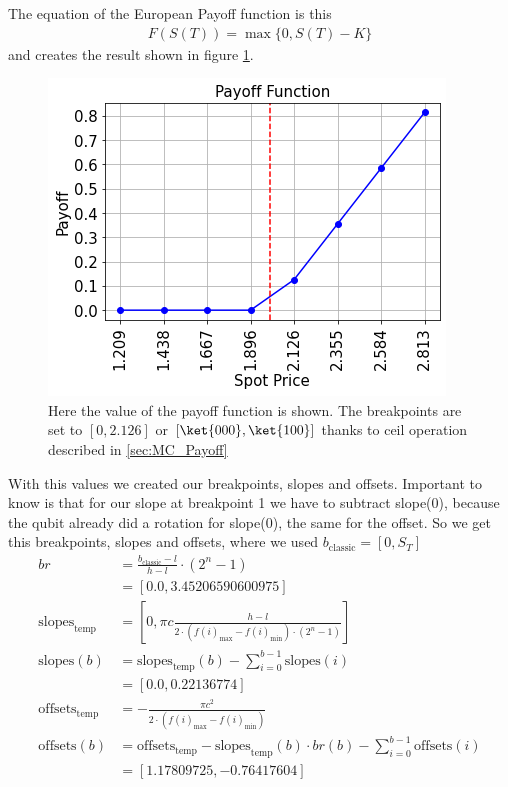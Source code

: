 The equation of the European Payoff function is this
\begin{align}
    F(S(T)) = \max\{0, S(T) - K\} \label{eq:E_example_european}
\end{align}
and creates the result shown in figure \ref{fig:E_payoff_function}.
\begin{figure}[H]
  \begin{center}
    \includegraphics[width=0.5\linewidth]{images/payoff_european.png}
  \end{center}
  \caption{Here the value of the payoff function is shown. The breakpoints are set to $[0, 2.126]$ or $[\ket{000}, \ket{100}]$ thanks to ceil operation described in \ref{sec:MC_Payoff}}
  \label{fig:E_payoff_function}
\end{figure}

With this values we created our breakpoints, slopes and offsets. Important to know is that for our slope at breakpoint 1 we have to subtract slope(0), because the qubit already did a rotation for slope(0), the same for the offset. So we get this breakpoints, slopes and offsets, where we used $b_{\text{classic}} = [0, S_T ]$
\begin{align}
    br &= \frac{b_{\text{classic}}-l}{h-l} \cdot (2^{n}-1) \nonumber \\
    &= [0.0, 3.45206590600975] \nonumber \\
    \text{slopes}_\text{temp} &= [0, \pi c\frac{h-l}{2\cdot (f(i)_\text{max}-f(i)_\text{min}) \cdot(2^{n}-1)}] \nonumber \\
    \text{slopes}(b) &= \text{slopes}_\text{temp}(b) - \sum_{i=0}^{b-1} \text{slopes}(i) \nonumber \\
     &= [0.0,         0.22136774] \nonumber \\
    \text{offsets}_\text{temp} &= - \frac{\pi c^2}{2\cdot (f(i)_\text{max}-f(i)_\text{min})} \nonumber \\
    \text{offsets}(b) &= \text{offsets}_\text{temp} - \text{slopes}_\text{temp}(b) \cdot br(b) - \sum_{i=0}^{b-1} \text{offsets}(i) \nonumber \\
    &= [ 1.17809725, -0.76417604] \nonumber
\end{align}

